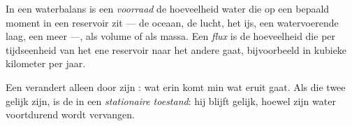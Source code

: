 \begin{definition}\label{def:g10:freshwater-resources:stock}
In een waterbalans is een \emph{voorraad} de
hoeveelheid water die op een bepaald moment in een reservoir zit --- de oceaan,
de lucht, het ijs, een watervoerende laag, een meer ---, als volume of als massa.
Een \emph{flux} is de hoeveelheid die per tijdseenheid
van het ene reservoir naar het andere gaat, bijvoorbeeld in kubieke kilometer per
jaar.
\end{definition}

Een  verandert alleen door zijn : wat erin komt min wat eruit gaat.
Als die twee gelijk zijn, is de  in een \emph{stationaire toestand}: hij
blijft gelijk, hoewel zijn water voortdurend wordt vervangen.


